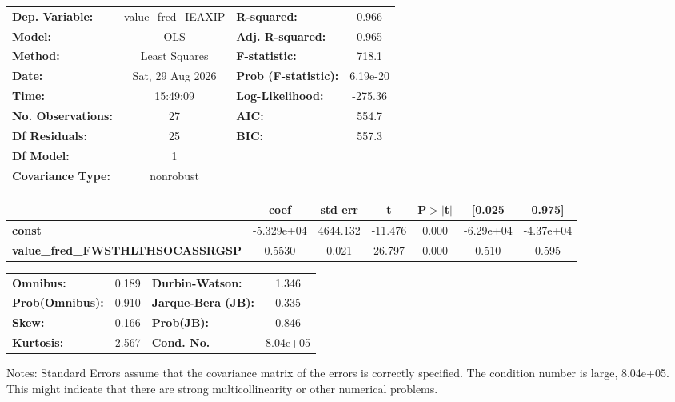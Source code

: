 \begin{center}
\begin{tabular}{lclc}
\toprule
\textbf{Dep. Variable:}                  & value\_fred\_IEAXIP & \textbf{  R-squared:         } &     0.966   \\
\textbf{Model:}                          &         OLS         & \textbf{  Adj. R-squared:    } &     0.965   \\
\textbf{Method:}                         &    Least Squares    & \textbf{  F-statistic:       } &     718.1   \\
\textbf{Date:}                           &   Sat, 29 Aug 2026  & \textbf{  Prob (F-statistic):} &  6.19e-20   \\
\textbf{Time:}                           &       15:49:09      & \textbf{  Log-Likelihood:    } &   -275.36   \\
\textbf{No. Observations:}               &            27       & \textbf{  AIC:               } &     554.7   \\
\textbf{Df Residuals:}                   &            25       & \textbf{  BIC:               } &     557.3   \\
\textbf{Df Model:}                       &             1       & \textbf{                     } &             \\
\textbf{Covariance Type:}                &      nonrobust      & \textbf{                     } &             \\
\bottomrule
\end{tabular}
\begin{tabular}{lcccccc}
                                         & \textbf{coef} & \textbf{std err} & \textbf{t} & \textbf{P$> |$t$|$} & \textbf{[0.025} & \textbf{0.975]}  \\
\midrule
\textbf{const}                           &   -5.329e+04  &     4644.132     &   -11.476  &         0.000        &    -6.29e+04    &    -4.37e+04     \\
\textbf{value\_fred\_FWSTHLTHSOCASSRGSP} &       0.5530  &        0.021     &    26.797  &         0.000        &        0.510    &        0.595     \\
\bottomrule
\end{tabular}
\begin{tabular}{lclc}
\textbf{Omnibus:}       &  0.189 & \textbf{  Durbin-Watson:     } &    1.346  \\
\textbf{Prob(Omnibus):} &  0.910 & \textbf{  Jarque-Bera (JB):  } &    0.335  \\
\textbf{Skew:}          &  0.166 & \textbf{  Prob(JB):          } &    0.846  \\
\textbf{Kurtosis:}      &  2.567 & \textbf{  Cond. No.          } & 8.04e+05  \\
\bottomrule
\end{tabular}
\end{center}

Notes: \newline
 [1] Standard Errors assume that the covariance matrix of the errors is correctly specified. \newline
 [2] The condition number is large, 8.04e+05. This might indicate that there are \newline
 strong multicollinearity or other numerical problems.